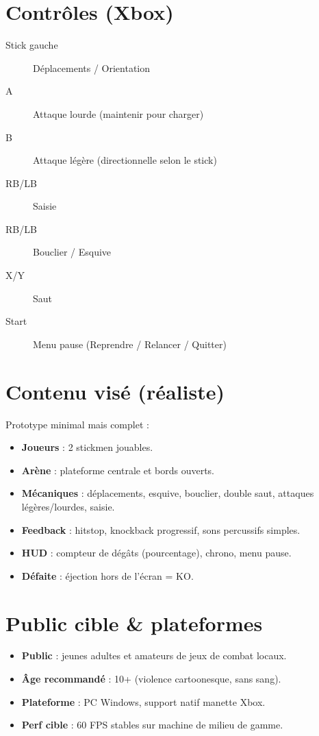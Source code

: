 \documentclass[10.8pt,letterpaper]{article}
\begin{document}
\begin{multicols}{2}
\section*{Contrôles (Xbox)}
\begin{description}
  \item[Stick gauche] Déplacements / Orientation
  \item[A] Attaque lourde (maintenir pour charger)
  \item[B] Attaque légère (directionnelle selon le stick)
  \item[RB/LB] Saisie
  \item[RB/LB] Bouclier / Esquive
  \item[X/Y] Saut
  \item[Start] Menu pause (Reprendre / Relancer / Quitter)
\end{description}

\section*{Contenu visé (réaliste)}
Prototype minimal mais complet :  
\begin{itemize}
  \item \textbf{Joueurs} : 2 stickmen jouables.
  \item \textbf{Arène} : plateforme centrale et bords ouverts.
  \item \textbf{Mécaniques} : déplacements, esquive, bouclier, double saut, attaques légères/lourdes, saisie.
  \item \textbf{Feedback} : hitstop, knockback progressif, sons percussifs simples.
  \item \textbf{HUD} : compteur de dégâts (pourcentage), chrono, menu pause.
  \item \textbf{Défaite} : éjection hors de l’écran = KO.
\end{itemize}

\section*{Public cible \& plateformes}
\begin{itemize}
  \item \textbf{Public} : jeunes adultes et amateurs de jeux de combat locaux.
  \item \textbf{Âge recommandé} : 10+ (violence cartoonesque, sans sang).
  \item \textbf{Plateforme} : PC Windows, support natif manette Xbox.
  \item \textbf{Perf cible} : 60 FPS stables sur machine de milieu de gamme.
\end{itemize}


\end{multicols}
\end{document}

